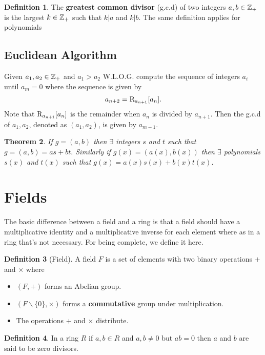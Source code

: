 \documentclass[12pt]{article}
\newtheorem{thm}{Theorem}
\theoremstyle{definition}
\newtheorem{defn}[thm]{Definition}
\begin{document}
\begin{defn}
The \textbf{greatest common divisor} (g.c.d) of two integers $a,b\in \mathbb{Z}_{+}$ is the largest $k\in\mathbb{Z}_{+}$ such that $k|a$ and $k|b$. The same definition applies for polynomials 
\end{defn}

\subsection{Euclidean Algorithm}
Given $a_{1},a_{2}\in \mathbb{Z}_{+}$ and $a_1 > a_2$ W.L.O.G. compute the sequence of integers $a_i$ until $a_{m}=0$ where the sequence is given by
\begin{align*}
a_{n+2}=\text{R}_{a_{n+1}}[a_{n}].
\end{align*}
Note that $\text{R}_{a_{n+1}}[a_{n}]$ is the remainder when $a_{n}$ is divided by $a_{n+1}$. Then the g.c.d of $a_{1},a_{2}$, denoted as $(a_1,a_2)$, is given by $a_{m-1}.$

\begin{thm}
If $g=(a,b)$ then $\exists$ integers $s$ and $t$ such that $g=(a,b)=as+bt.$ Similarly if  $g(x)=(a(x),b(x))$ then $\exists$ polynomials $s(x)$ and $t(x)$ such that $g(x)=a(x)s(x)+b(x)t(x)$.
\end{thm}

\section{Fields}
The basic difference between a field and a ring is that a field should have a multiplicative identity and a multiplicative inverse for each element where as in a ring that's not necessary. For being complete, we define it here. \\
\begin{defn}[Field]
A field $F$ is a set of elements with two binary operations $+$ and $\times$ where
\begin{itemize}
\item $(F,+)$ forms an Abelian group.
\item $(F\backslash \{0\},\times)$ forms a \textbf{commutative} group under multiplication.
\item The operations $+$ and $\times$ distribute.
\end{itemize}
\end{defn}

\begin{defn}
In a ring $R$ if $a,b\in R$ and $a,b\neq 0$ but $ab=0$ then $a$ and $b$ are said to be zero divisors.
\end{defn}
\end{document}
